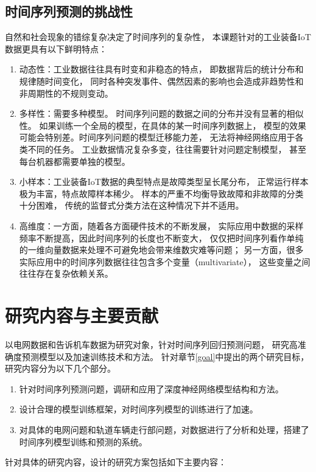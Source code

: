   \subsection{时间序列预测的挑战性}
    自然和社会现象的错综复杂决定了时间序列的复杂性，
    本课题针对的工业装备IoT数据更具有以下鲜明特点：
    \begin{enumerate}[(1)]
      \item 动态性：工业数据往往具有时变和非稳态的特点，
      即数据背后的统计分布和规律随时间变化，
      同时各种突发事件、偶然因素的影响也会造成非趋势性和非周期性的不规则变动。
      \item 多样性：需要多种模型。
      时间序列问题的数据之间的分布并没有显著的相似性。
      如果训练一个全局的模型，在具体的某一时间序列数据上，
      模型的效果可能会特别差。时间序列问题的模型迁移能力差，
      无法将神经网络应用于各类不同的任务。
      工业数据情况复杂多变，往往需要针对问题定制模型，
      甚至每台机器都需要单独的模型。
      \item 小样本：工业装备IoT数据的典型特点是故障类型呈长尾分布，
      正常运行样本极为丰富，特点故障样本稀少。
      样本的严重不均衡导致故障和非故障的分类十分困难，
      传统的监督式分类方法在这种情况下并不适用。
      \item 高维度：一方面，随着各方面硬件技术的不断发展，
      实际应用中数据的采样频率不断提高，因此时间序列的长度也不断变大，
      仅仅把时间序列看作单纯的一维向量数据来处理不可避免地会带来维数灾难等问题；
      另一方面，很多实际应用中的时间序列数据往往包含多个变量（multivariate），
      这些变量之间往往存在复杂依赖关系。
    \end{enumerate}

\section{研究内容与主要贡献}
以电网数据和告诉机车数据为研究对象，针对时间序列回归预测问题，
研究高准确度预测模型以及加速训练技术和方法。
针对章节\ref{goal}中提出的两个研究目标，研究内容分为以下几个部分。
\begin{enumerate}[(1)]
  \item 针对时间序列预测问题，调研和应用了深度神经网络模型结构和方法。
  \item 设计合理的模型训练框架，对时间序列模型的训练进行了加速。
  \item 对具体的电网问题和轨道车辆走行部问题，对数据进行了分析和处理，搭建了时间序列模型训练和预测的系统。
\end{enumerate}

针对具体的研究内容，设计的研究方案包括如下主要内容：

